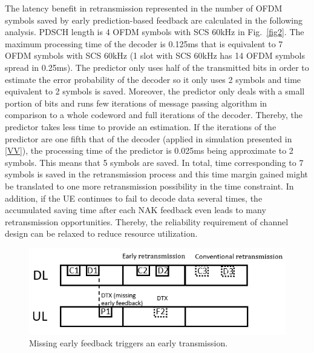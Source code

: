 \documentclass[conference]{IEEEtran}
\begin{document}
The latency benefit in retransmission represented in the number of OFDM symbols saved by early prediction-based feedback are calculated in the following analysis. PDSCH length is 4 OFDM symbols with SCS 60kHz in Fig.~\ref{fig2}. The maximum processing time of the decoder is 0.125ms that is equivalent to 7 OFDM symbols with SCS 60kHz (1 slot with SCS 60kHz has 14 OFDM symbols spread in 0.25ms). The predictor only uses half of the transmitted bits in order to estimate the error probability of the decoder so it only uses 2 symbols and time equivalent to 2 symbols is saved. Moreover, the predictor only deals with a small portion of bits and runs few iterations of message passing algorithm in comparison to a whole codeword and full iterations of the decoder. Thereby, the predictor takes less time to provide an estimation. If the iterations of the predictor are one fifth that of the decoder (applied in simulation presented in \ref{VV}), the processing time of the predictor is 0.025ms being approximate to 2 symbols. This means that 5 symbols are saved. In total, time corresponding to 7 symbols is saved in the retransmission process and this time margin gained  might be translated  to  one more  retransmission  possibility  in the time constraint. In addition, if the UE continues to fail to decode data several times, the accumulated saving time after each NAK feedback even leads to many retransmission opportunities.  Thereby,  the reliability  requirement  of  channel  design  can  be  relaxed to  reduce  resource  utilization. 
\begin{figure}[htbp]
\centerline{\includegraphics[scale=0.33]{fig3.png}}
\caption{Missing early feedback triggers an early transmission.}
\label{fig3}
\end{figure}
\end{document}
